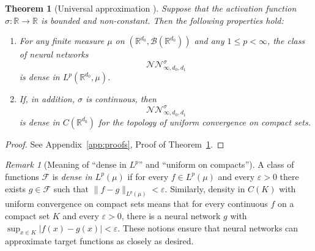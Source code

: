 \documentclass[12pt,a4paper]{article}
\theoremstyle{definition}
\theoremstyle{plain}
\newtheorem{theorem}{Theorem}[section]
\theoremstyle{remark}
\newtheorem{remark}{Remark}[section]
\theoremstyle{plain}
\begin{document}
\begin{theorem}[Universal approximation \cite{Hornik1991}]
\label{thm:universal_approx_new}
Suppose that the activation function $\sigma:\mathbb{R}\to\mathbb{R}$ is bounded and non-constant.  
Then the following properties hold:

\begin{enumerate}
    \item For any finite measure $\mu$ on $(\mathbb{R}^{d_0},\mathcal{B}(\mathbb{R}^{d_0}))$ and any $1 \le p < \infty$, the class of neural networks
    \[
        \mathcal{NN}^{\sigma}_{\infty,d_0,d_1}
    \]
    is dense in $L^p(\mathbb{R}^{d_0},\mu)$.

    \item If, in addition, $\sigma$ is continuous, then  
    \[
        \mathcal{NN}^{\sigma}_{\infty,d_0,d_1}
    \]
    is dense in $C(\mathbb{R}^{d_0})$ for the topology of uniform convergence on compact sets.
\end{enumerate}
\end{theorem}

\begin{proof}
See Appendix~\ref{app:proofs}, Proof of Theorem~\ref{thm:universal_approx_new}.
\end{proof}

\begin{remark}[Meaning of ``dense in $L^p$'' and ``uniform on compacts'']\label{rem:density}
A class of functions $\mathcal{F}$ is \emph{dense in $L^p(\mu)$} if for every $f\in L^p(\mu)$ and every $\varepsilon>0$ there exists $g\in\mathcal{F}$ such that $\|f-g\|_{L^p(\mu)}<\varepsilon$. 
Similarly, density in $C(K)$ with uniform convergence on compact sets means that for every continuous $f$ on a compact set $K$ and every $\varepsilon>0$, there is a neural network $g$ with $\sup_{x\in K}|f(x)-g(x)|<\varepsilon$. 
These notions ensure that neural networks can approximate target functions as closely as desired.
\end{remark}
\end{document}

